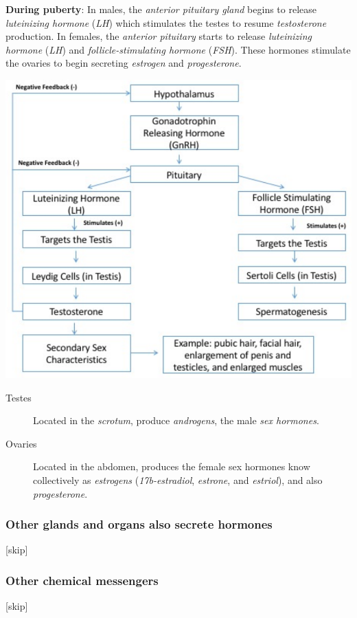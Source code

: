\documentclass[11pt]{article}
\begin{document}
\textbf{During puberty}: In males, the \emph{anterior pituitary gland} begins to release
\emph{luteinizing hormone} (\emph{LH}) which stimulates the testes to resume \emph{testosterone}
production. In females, the \emph{anterior pituitary} starts to release \emph{luteinizing
hormone} (\emph{LH}) and \emph{follicle-stimulating hormone} (\emph{FSH}). These hormones stimulate
the ovaries to begin secreting \emph{estrogen} and \emph{progesterone}.

\begin{center}
\includegraphics[width=.9\linewidth]{book/screenshot_2016-11-10_22-49-30.png}
\end{center}

\begin{description}
\item[{Testes}] Located in the \emph{scrotum}, produce \emph{androgens}, the male \emph{sex hormones}.
\item[{Ovaries}] Located in the abdomen, produces the female  sex hormones know
collectively as \emph{estrogens} (\emph{17b-estradiol}, \emph{estrone}, and \emph{estriol}), and also
\emph{progesterone}.
\end{description}

\subsubsection{Other glands and organs also secrete hormones}
\label{sec:orgab7231b}
[skip]

\subsubsection{Other chemical messengers}
\label{sec:org724a53a}
[skip]
\end{document}
